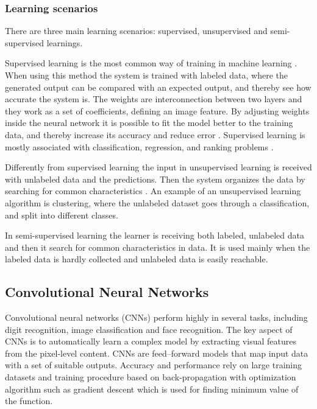 \subsubsection{Learning scenarios}
There are three main learning scenarios: supervised, unsupervised and semi-supervised learnings.

Supervised learning is the most common way of training in machine learning \citep{LeCun2015}. When using this method the system is trained with labeled data, where the generated output can be compared with an expected output, and thereby see how accurate the system is. The weights are interconnection between two layers and they work as a set of coefficients, defining an image feature.\citep{Hameed2016} By adjusting weights inside the neural network it is possible to fit the model better to the training data, and thereby increase its accuracy and reduce error \citep{LeCun2015}. Supervised learning is mostly associated with classification, regression, and ranking problems \citep{Mehryar2012}.

Differently from supervised learning the input in unsupervised learning is received with unlabeled data and the predictions. Then the system organizes the data by searching for common characteristics \citep{Mehryar2012}. An example of an unsupervised learning algorithm is clustering, where the unlabeled dataset goes through a classification, and split into different classes.\citep{Goodfellow2016} 

In semi-supervised learning the learner is receiving both labeled, unlabeled data and then it search for common characteristics in data. It is used mainly when the labeled data is hardly collected and unlabeled data is easily reachable.\citep{Mehryar2012}

\subsection{Convolutional Neural Networks}
Convolutional neural networks (CNNs) perform highly in several tasks, including digit recognition, image classification and face recognition. The key aspect of CNNs is to automatically learn a complex model by extracting visual features from the pixel-level content.
CNNs are feed–forward models that map input data with a set of suitable outputs. 
Accuracy and performance rely on large training datasets and training procedure based on back-propagation with optimization algorithm such as gradient descent which is used for finding minimum value of the function.\citep{Acquarelli2017}

